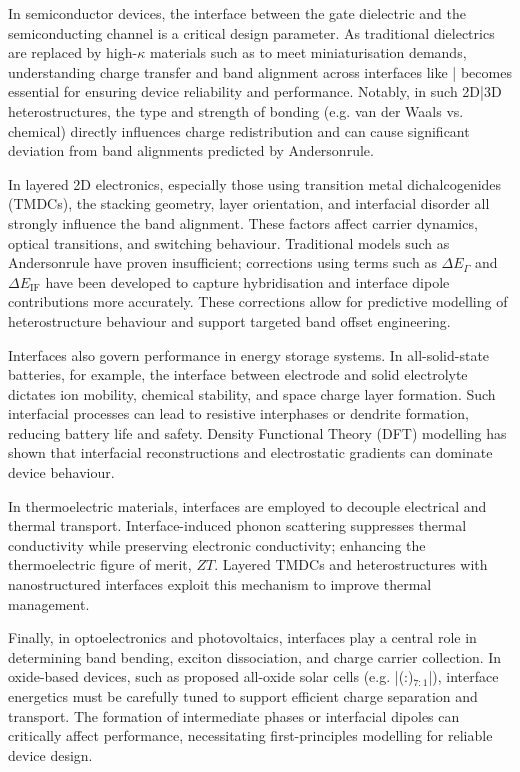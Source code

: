 In semiconductor devices, the interface between the gate dielectric and the semiconducting channel is a critical design parameter. As traditional  dielectrics are replaced by high-$\kappa$ materials such as  to meet miniaturisation demands, understanding charge transfer and band alignment across interfaces like |  becomes essential for ensuring device reliability and performance. Notably, in such 2D|3D heterostructures, the type and strength of bonding (e.g. van der Waals vs. chemical) directly influences charge redistribution and can cause significant deviation from band alignments predicted by Anderson\rqs rule.

In layered 2D electronics, especially those using transition metal dichalcogenides (TMDCs), the stacking geometry, layer orientation, and interfacial disorder all strongly influence the band alignment. These factors affect carrier dynamics, optical transitions, and switching behaviour. Traditional models such as Anderson\rqss rule have proven insufficient; corrections using terms such as $\Delta E_\Gamma$ and $\Delta E_{\text{IF}}$ have been developed to capture hybridisation and interface dipole contributions more accurately. These corrections allow for predictive modelling of heterostructure behaviour and support targeted band offset engineering.

Interfaces also govern performance in energy storage systems. In all-solid-state batteries, for example, the interface between electrode and solid electrolyte dictates ion mobility, chemical stability, and space charge layer formation. Such interfacial processes can lead to resistive interphases or dendrite formation, reducing battery life and safety. Density Functional Theory (DFT) modelling has shown that interfacial reconstructions and electrostatic gradients can dominate device behaviour.

In thermoelectric materials, interfaces are employed to decouple electrical and thermal transport. Interface-induced phonon scattering suppresses thermal conductivity while preserving electronic conductivity; enhancing the thermoelectric figure of merit, $ZT$. Layered TMDCs and heterostructures with nanostructured interfaces exploit this mechanism to improve thermal management.

Finally, in optoelectronics and photovoltaics, interfaces play a central role in determining band bending, exciton dissociation, and charge carrier collection. In oxide-based devices, such as proposed all-oxide solar cells (e.g. |(:)$_{7:1}$|), interface energetics must be carefully tuned to support efficient charge separation and transport. The formation of intermediate phases or interfacial dipoles can critically affect performance, necessitating first-principles modelling for reliable device design.

